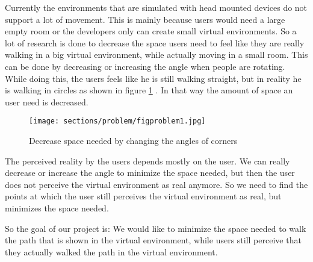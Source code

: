 Currently the environments that are simulated with head mounted devices do not support a lot of movement. This is mainly because users would need a large empty room or the developers only can create small virtual environments. So a lot of research is done to decrease the space users need to feel like they are really walking in a big virtual environment, while actually moving in a small room. This can be done by decreasing or increasing the angle when people are rotating. While doing this, the users feels like he is still walking straight, but in reality he is walking in circles as shown in figure  \ref{figprob1} . In that way the amount of space an user need is decreased.
\begin{figure}[ht!]
\centering
\texttt{[image: sections/problem/figproblem1.jpg]}
\caption{Decrease space needed by changing the angles of corners \label{figprob1}}
\end{figure}
The perceived reality by the users depends mostly on the user. We can really decrease or increase the angle to minimize the space needed, but then the user does not perceive the virtual environment as real anymore. So we need to find the points at which the user still perceives the virtual environment as real, but minimizes the space needed.

So the goal of our project is: We would like to minimize the space needed to walk the path that is shown in the virtual environment, while users still perceive that they actually walked the path in the virtual environment.
